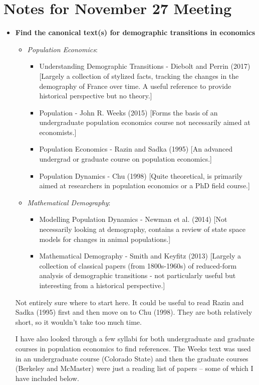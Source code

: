 \documentclass{article}
\begin{document}
{}

\section*{Notes for November 27 Meeting}

\begin{itemize}
\item \textbf{Find the canonical text(s) for demographic transitions in economics}
\begin{itemize}
\item \textit{Population Economics}:
\begin{itemize}
\item Understanding Demographic Transitions - Diebolt and Perrin (2017) [Largely a collection of stylized facts, tracking the changes in the demography of France over time. A useful reference to provide historical perspective but no theory.]
\item Population - John R. Weeks (2015) [Forms the basis of an undergraduate population economics course not necessarily aimed at economists.]
\item Population Economics - Razin and Sadka (1995) [An advanced undergrad or graduate course on population economics.]
\item Population Dynamics - Chu (1998) [Quite theoretical, is primarily aimed at researchers in population economics or a PhD field course.]\
\end{itemize}
\item \textit{Mathematical Demography}:
\begin{itemize}
\item Modelling Population Dynamics - Newman et al. (2014) [Not necessarily looking at demography, contains a review of state space models for changes in animal populations.]
\item Mathematical Demography - Smith and Keyfitz (2013) [Largely a collection of classical papers (from 1800s-1960s) of reduced-form analysis of demographic transitions - not particularly useful but interesting from a historical perspective.]
\end{itemize}
\end{itemize}

Not entirely sure where to start here. It could be useful to read Razin and Sadka (1995) first and then move on to Chu (1998). They are both relatively short, so it wouldn't take too much time.

I have also looked through a few syllabi for both undergraduate and graduate courses in population economics to find references. The Weeks text was used in an undergraduate course (Colorado State) and then the graduate courses (Berkeley and McMaster) were just a reading list of papers -- some of which I have included below.


\end{itemize}
\end{document}

